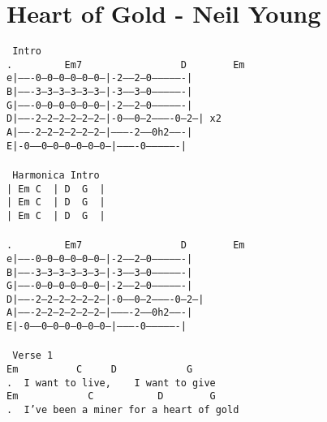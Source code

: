 \newpage
\section{Heart of Gold - Neil Young}
\label{Heart of Gold - Neil Young}
\texttt{\lbrack\ Intro\rbrack\\
. \ \ \ \ \ \ \ \ Em7\ \ \ \ \ \ \ \ \ \ \ \ \ \ \ \ \ D\ \ \ \ \ \ \ \ Em\\
e|-------0--0--0--0--0--0--|-2-----2--0----------------|\\
B|-------3--3--3--3--3--3--|-3-----3--0----------------|\\
G|-------0--0--0--0--0--0--|-2-----2--0----------------|\\
D|-------2--2--2--2--2--2--|-0-----0--2----------0--2--|\ x2\\
A|-------2--2--2--2--2--2--|----------2------0h2-------|\\
E|-0-----0--0--0--0--0--0--|----------0----------------|\\
\\
\lbrack\ Harmonica\ Intro\rbrack\\
|\ Em\ C\ \ |\ D\ \ G\ \ |\\
|\ Em\ C\ \ |\ D\ \ G\ \ |\\
|\ Em\ C\ \ |\ D\ \ G\ \ |\\
\\
. \ \ \ \ \ \ \ \ Em7\ \ \ \ \ \ \ \ \ \ \ \ \ \ \ \ \ D\ \ \ \ \ \ \ \ Em\\
e|-------0--0--0--0--0--0--|-2-----2--0----------------|\\
B|-------3--3--3--3--3--3--|-3-----3--0----------------|\\
G|-------0--0--0--0--0--0--|-2-----2--0----------------|\\
D|-------2--2--2--2--2--2--|-0-----0--2----------0--2--|\\
A|-------2--2--2--2--2--2--|----------2------0h2-------|\\
E|-0-----0--0--0--0--0--0--|----------0----------------|\\
\\
\lbrack\ Verse\ 1\rbrack\\
Em\ \ \ \ \ \ \ \ \ \ C\ \ \ \ \ D\ \ \ \ \ \ \ \ \ \ \ \ G\\
. \ I\ want\ to\ live,\ \ \ \ I\ want\ to\ give\\
Em\ \ \ \ \ \ \ \ \ \ \ \ C\ \ \ \ \ \ \ \ \ \ \ D\ \ \ \ \ \ \ \ G\\
. \ I've\ been\ a\ miner\ for\ a\ heart\ of\ gold\\
}
